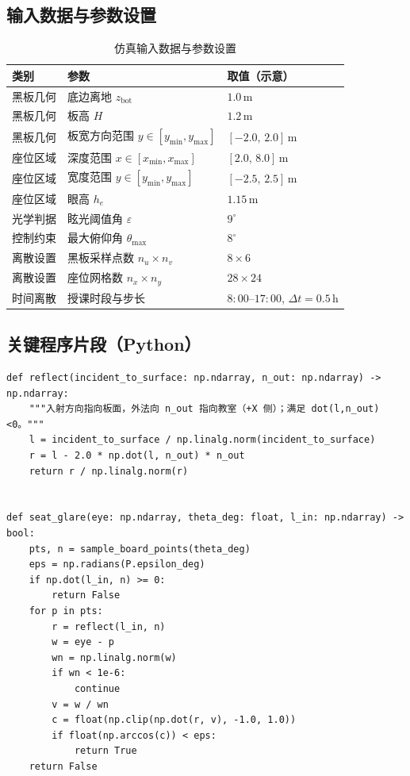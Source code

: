 \documentclass[UTF8,a4paper,12pt]{ctexart}
\begin{document}
\subsection*{输入数据与参数设置}
\begin{table}[H]
\centering
\begin{tabular}{@{}lll@{}}
\toprule
类别 & 参数 & 取值（示意） \\
\midrule
黑板几何 & 底边离地 $z_{\mathrm{bot}}$ & $1.0\,\mathrm{m}$ \\
黑板几何 & 板高 $H$ & $1.2\,\mathrm{m}$ \\
黑板几何 & 板宽方向范围 $y\in[y_{\min},y_{\max}]$ & $[-2.0,\,2.0]\,\mathrm{m}$ \\
座位区域 & 深度范围 $x\in[x_{\min},x_{\max}]$ & $[2.0,\,8.0]\,\mathrm{m}$ \\
座位区域 & 宽度范围 $y\in[y_{\min},y_{\max}]$ & $[-2.5,\,2.5]\,\mathrm{m}$ \\
座位区域 & 眼高 $h_e$ & $1.15\,\mathrm{m}$ \\
光学判据 & 眩光阈值角 $\varepsilon$ & $9^\circ$ \\
控制约束 & 最大俯仰角 $\theta_{\max}$ & $8^\circ$ \\
离散设置 & 黑板采样点数 $n_u\times n_v$ & $8\times6$ \\
离散设置 & 座位网格数 $n_x\times n_y$ & $28\times24$ \\
时间离散 & 授课时段与步长 & $8{:}00$--$17{:}00$, $\Delta t=0.5\,\mathrm{h}$ \\
\bottomrule
\end{tabular}
\caption{仿真输入数据与参数设置}
\label{tab:input}
\end{table}

\subsection*{关键程序片段（Python）}

\begin{Verbatim}[breaklines=true,breakanywhere=true,frame=single]
def reflect(incident_to_surface: np.ndarray, n_out: np.ndarray) -> np.ndarray:
    """入射方向指向板面，外法向 n_out 指向教室（+X 侧）；满足 dot(l,n_out)<0。"""
    l = incident_to_surface / np.linalg.norm(incident_to_surface)
    r = l - 2.0 * np.dot(l, n_out) * n_out
    return r / np.linalg.norm(r)


def seat_glare(eye: np.ndarray, theta_deg: float, l_in: np.ndarray) -> bool:
    pts, n = sample_board_points(theta_deg)
    eps = np.radians(P.epsilon_deg)
    if np.dot(l_in, n) >= 0:
        return False
    for p in pts:
        r = reflect(l_in, n)
        w = eye - p
        wn = np.linalg.norm(w)
        if wn < 1e-6:
            continue
        v = w / wn
        c = float(np.clip(np.dot(r, v), -1.0, 1.0))
        if float(np.arccos(c)) < eps:
            return True
    return False
\end{Verbatim}
\FloatBarrier
\end{document}
